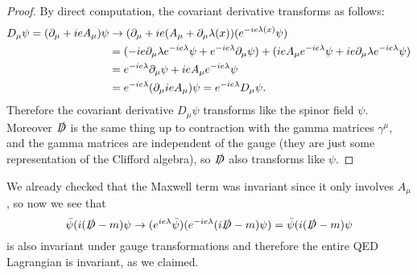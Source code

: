 \begin{proof}
By direct computation, the covariant derivative transforms as follows:
\begin{align*}
    D_\mu \psi = (\partial_\mu+ie A_\mu)\psi &\to (\partial_\mu+ie (A_\mu+\partial_\mu \lambda(x))(e^{-ie\lambda(x)}\psi)\\
    &=(-ie \partial_\mu \lambda e^{-ie\lambda} \psi + e^{-ie\lambda} \partial_\mu \psi)+(ie A_\mu e^{-ie\lambda} \psi + ie \partial_\mu \lambda e^{-ie\lambda}\psi)\\
    &= e^{-ie\lambda} \partial_\mu \psi+ie A_\mu e^{-ie\lambda} \psi\\
    &= e^{-ie \lambda} (\partial_\mu ie A_\mu)\psi = e^{-ie\lambda} D_\mu \psi.
\end{align*}
Therefore the covariant derivative $D_\mu \psi$ transforms like the spinor field $\psi$. Moreover $\slashed{D}$ is the same thing up to contraction with the gamma matrices $\gamma^\mu$, and the gamma matrices are independent of the gauge (they are just some representation of the Clifford algebra), so $\slashed{D}$ also transforms like $\psi$.
\end{proof}

We already checked that the Maxwell term was invariant since it only involves $A_\mu$, so now we see that $$\bar \psi (i(\slashed{D}-m)\psi \to (e^{ie\lambda}\bar \psi)(e^{-ie\lambda} (i\slashed{D}-m)\psi)=\bar \psi (i(\slashed{D}-m)\psi$$
is also invariant under gauge transformations and therefore the entire QED Lagrangian is invariant, as we claimed.

